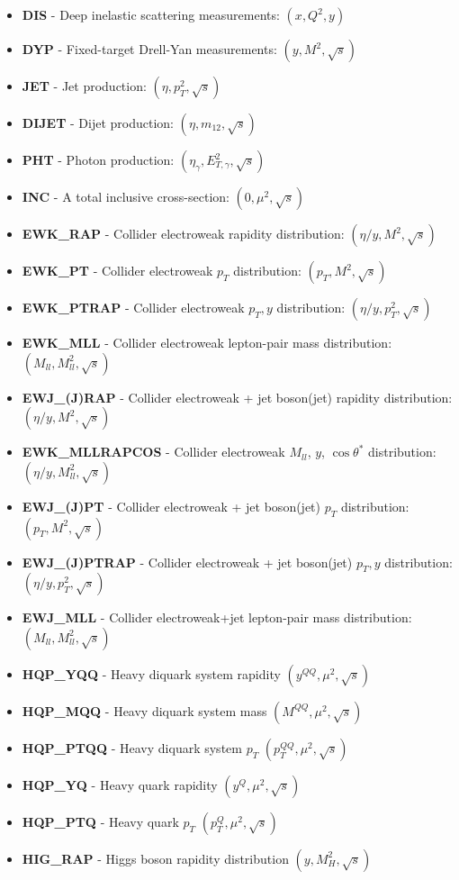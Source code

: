 \documentclass[11pt]{article}
\begin{document}
\begin{itemize}
\item \textbf{DIS} - Deep inelastic scattering measurements: $(x,Q^2,y)$
\item \textbf{DYP} - Fixed-target Drell-Yan measurements: $(y,M^2,\sqrt{s})$
\item \textbf{JET} - Jet production: $(\eta,p_T^2,\sqrt{s})$
\item \textbf{DIJET} - Dijet production: $(\eta,m_{12},\sqrt{s})$
\item \textbf{PHT} - Photon production: $(\eta_\gamma,E_{T,\gamma}^2,\sqrt{s})$
\item \textbf{INC} - A total inclusive cross-section: $(0,\mu^2,\sqrt{s})$
\item \textbf{EWK\_RAP} - Collider electroweak rapidity distribution: $(\eta/y,M^2,\sqrt{s})$
\item \textbf{EWK\_PT} - Collider electroweak $p_T$ distribution: $(p_T,M^2,\sqrt{s})$
\item \textbf{EWK\_PTRAP} - Collider electroweak $p_T, y$ distribution: $(\eta/y, p_T^2,\sqrt{s})$
\item \textbf{EWK\_MLL} - Collider electroweak lepton-pair mass distribution: $(M_{ll},M_{ll}^2,\sqrt{s})$
\item \textbf{EWJ\_(J)RAP} - Collider electroweak + jet boson(jet) rapidity distribution: $(\eta/y,M^2,\sqrt{s})$
\item \textbf{EWK\_MLLRAPCOS} - Collider electroweak $M_{ll}$, $y$, 
$\cos\theta^*$ distribution: $(\eta/y, M_{ll}^2, \sqrt{s})$
\item \textbf{EWJ\_(J)PT} - Collider electroweak + jet boson(jet) $p_T$ distribution: $(p_T,M^2,\sqrt{s})$
\item \textbf{EWJ\_(J)PTRAP} - Collider electroweak + jet boson(jet) $p_T, y$ distribution: $(\eta/y, p_T^2,\sqrt{s})$
\item \textbf{EWJ\_MLL} - Collider electroweak+jet lepton-pair mass distribution: $(M_{ll},M_{ll}^2,\sqrt{s})$
\item \textbf{HQP\_YQQ} - Heavy diquark system rapidity $(y^{QQ},\mu^2,\sqrt{s})$
\item \textbf{HQP\_MQQ} - Heavy diquark system mass $(M^{QQ},\mu^2,\sqrt{s})$
\item \textbf{HQP\_PTQQ} - Heavy diquark system $p_T$ $(p_T^{QQ},\mu^2,\sqrt{s})$
\item \textbf{HQP\_YQ} - Heavy quark rapidity $(y^Q,\mu^2,\sqrt{s})$
\item \textbf{HQP\_PTQ} - Heavy quark $p_T$ $(p_T^Q,\mu^2,\sqrt{s})$
\item \textbf{HIG\_RAP} - Higgs boson rapidity distribution $(y,M_H^2,\sqrt{s})$
\end{itemize}
\end{document}
